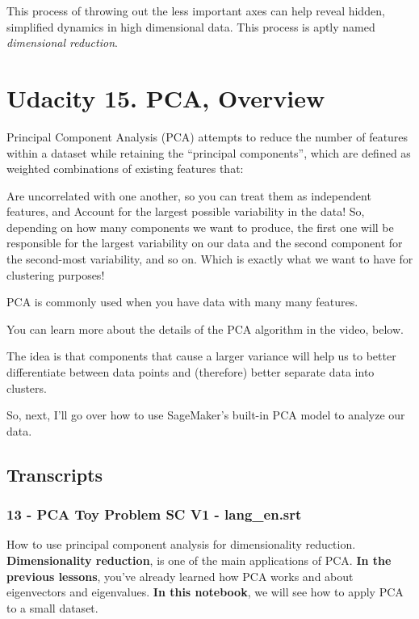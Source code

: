 This process of throwing out the less important axes can help reveal
hidden, simplified dynamics in high dimensional data. This process is
aptly named \emph{dimensional reduction}.

\hypertarget{udacity-15.-pca-overview}{%
\section{Udacity 15. PCA, Overview}\label{udacity-15.-pca-overview}}

Principal Component Analysis (PCA) attempts to reduce the number of
features within a dataset while retaining the ``principal components'',
which are defined as weighted combinations of existing features that:

Are uncorrelated with one another, so you can treat them as independent
features, and Account for the largest possible variability in the data!
So, depending on how many components we want to produce, the first one
will be responsible for the largest variability on our data and the
second component for the second-most variability, and so on. Which is
exactly what we want to have for clustering purposes!

PCA is commonly used when you have data with many many features.

You can learn more about the details of the PCA algorithm in the video,
below.

The idea is that components that cause a larger variance will help us to
better differentiate between data points and (therefore) better separate
data into clusters.

So, next, I'll go over how to use SageMaker's built-in PCA model to
analyze our data.

\hypertarget{transcripts}{%
\subsection{Transcripts}\label{transcripts}}

\hypertarget{pca-toy-problem-sc-v1---lang_en.srt}{%
\subsubsection{13 - PCA Toy Problem SC V1 -
lang\_en.srt}\label{pca-toy-problem-sc-v1---lang_en.srt}}

How to use principal component analysis for dimensionality reduction.
\textbf{Dimensionality reduction}, is one of the main applications of
PCA. \textbf{In the previous lessons}, you've already learned how PCA
works and about eigenvectors and eigenvalues. \textbf{In this notebook},
we will see how to apply PCA to a small dataset.

